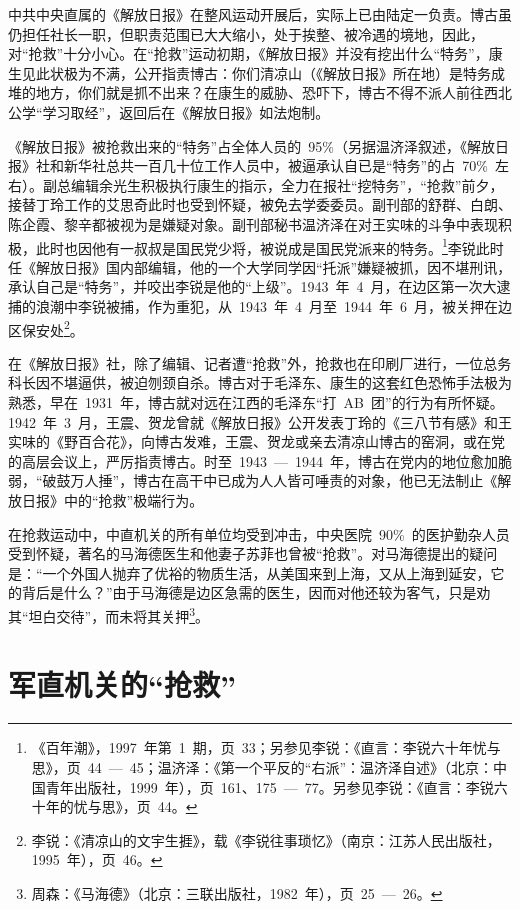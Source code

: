 中共中央直属的《解放日报》在整风运动开展后，实际上已由陆定一负责。博古虽仍担任社长一职，但职责范围已大大缩小，处于挨整、被冷遇的境地，因此，对“抢救”十分小心。在“抢救”运动初期，《解放日报》并没有挖出什么“特务”，康生见此状极为不满，公开指责博古：你们清凉山（《解放日报》所在地）是特务成堆的地方，你们就是抓不出来？在康生的威胁、恐吓下，博古不得不派人前往西北公学“学习取经”，返回后在《解放日报》如法炮制。

《解放日报》被抢救出来的“特务”占全体人员的~95\%（另据温济泽叙述，《解放日报》社和新华社总共一百几十位工作人员中，被逼承认自已是“特务”的占~70\%~左右）。副总编辑余光生积极执行康生的指示，全力在报社“挖特务”，“抢救”前夕，接替丁玲工作的艾思奇此时也受到怀疑，被免去学委委员。副刊部的舒群、白朗、陈企霞、黎辛都被视为是嫌疑对象。副刊部秘书温济泽在对王实味的斗争中表现积极，此时也因他有一叔叔是国民党少将，被说成是国民党派来的特务。\footnote{《百年潮》，1997~年第~1~期，页~33；另参见李锐：《直言：李锐六十年忧与思》，页~44~—~45；温济泽：《第一个平反的“右派”：温济泽自述》（北京：中国青年出版社，1999~年），页~161、175~—~77。另参见李锐：《直言：李锐六十年的忧与思》，页~44。}李锐此时任《解放日报》国内部编辑，他的一个大学同学因“托派”嫌疑被抓，因不堪刑讯，承认自己是“特务”，并咬出李锐是他的“上级”。1943~年~4~月，在边区第一次大逮捕的浪潮中李锐被捕，作为重犯，从~1943~年~4~月至~1944~年~6~月，被关押在边区保安处\footnote{李锐：《清凉山的文宇生捱》，载《李锐往事琐忆》（南京：江苏人民出版社，1995~年），页~46。}。

在《解放日报》社，除了编辑、记者遭“抢救”外，抢救也在印刷厂进行，一位总务科长因不堪逼供，被迫刎颈自杀。博古对于毛泽东、康生的这套红色恐怖手法极为熟悉，早在~1931~年，博古就对远在江西的毛泽东“打~AB~团”的行为有所怀疑。1942~年~3~月，王震、贺龙曾就《解放日报》公开发表丁玲的《三八节有感》和王实味的《野百合花》，向博古发难，王震、贺龙或亲去清凉山博古的窑洞，或在党的高层会议上，严厉指责博古。时至~1943~—~1944~年，博古在党内的地位愈加脆弱，“破鼓万人捶”，博古在高干中已成为人人皆可唾责的对象，他已无法制止《解放日报》中的“抢救”极端行为。

在抢救运动中，中直机关的所有单位均受到冲击，中央医院~90\%~的医护勤杂人员受到怀疑，著名的马海德医生和他妻子苏菲也曾被“抢救”。对马海德提出的疑问是：“一个外国人抛弃了优裕的物质生活，从美国来到上海，又从上海到延安，它的背后是什么？”由于马海德是边区急需的医生，因而对他还较为客气，只是劝其“坦白交待”，而未将其关押\footnote{周森：《马海德》（北京：三联出版社，1982~年），页~25~—~26。}。

\section{军直机关的“抢救”}

